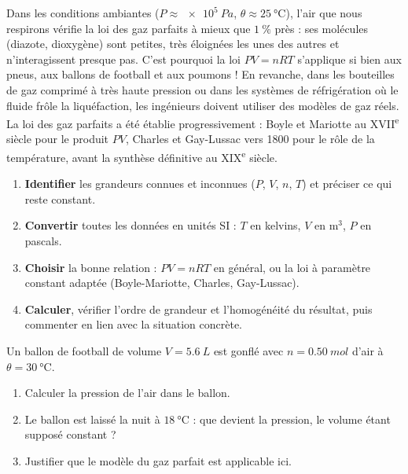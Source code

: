 \documentclass[11pt]{article}
\begin{document}
\begin{savaistu}
Dans les conditions ambiantes ($P \approx \SI{e5}{Pa}$, $\theta \approx \SI{25}{\celsius}$), l'air que nous respirons vérifie la loi des gaz parfaits à mieux que $1\ \%$ près : ses molécules (diazote, dioxygène) sont petites, très éloignées les unes des autres et n'interagissent presque pas. C'est pourquoi la loi $PV = nRT$ s'applique si bien aux pneus, aux ballons de football et aux poumons ! En revanche, dans les bouteilles de gaz comprimé à très haute pression ou dans les systèmes de réfrigération où le fluide frôle la liquéfaction, les ingénieurs doivent utiliser des modèles de gaz réels. La loi des gaz parfaits a été établie progressivement : Boyle et Mariotte au XVII\textsuperscript{e} siècle pour le produit $PV$, Charles et Gay-Lussac vers 1800 pour le rôle de la température, avant la synthèse définitive au XIX\textsuperscript{e} siècle.
\end{savaistu}

\begin{methode}
\begin{enumerate}
\item \textbf{Identifier} les grandeurs connues et inconnues ($P$, $V$, $n$, $T$) et préciser ce qui reste constant.
\item \textbf{Convertir} toutes les données en unités SI : $T$ en kelvins, $V$ en $\text{m}^3$, $P$ en pascals.
\item \textbf{Choisir} la bonne relation : $PV = nRT$ en général, ou la loi à paramètre constant adaptée (Boyle-Mariotte, Charles, Gay-Lussac).
\item \textbf{Calculer}, vérifier l'ordre de grandeur et l'homogénéité du résultat, puis commenter en lien avec la situation concrète.
\end{enumerate}
\end{methode}

\begin{exercice}
Un ballon de football de volume $V = \SI{5,6}{L}$ est gonflé avec $n = \SI{0,50}{mol}$ d'air à $\theta = \SI{30}{\celsius}$. 
\begin{enumerate}
\item Calculer la pression de l'air dans le ballon.
\item Le ballon est laissé la nuit à $\SI{18}{\celsius}$ : que devient la pression, le volume étant supposé constant ?
\item Justifier que le modèle du gaz parfait est applicable ici.
\end{enumerate}
\end{exercice}
\end{document}
